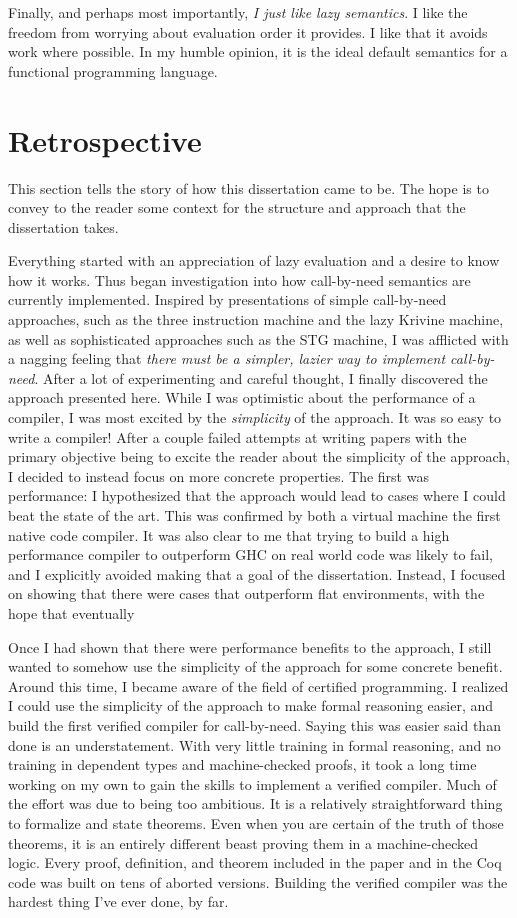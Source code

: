 Finally, and perhaps most importantly, \emph{I just like lazy semantics}. I like
the freedom from worrying about evaluation order it provides. I like that it
avoids work where possible. In my humble opinion, it is the ideal default
semantics for a functional programming language.   

\section{Retrospective}

This section tells the story of how this dissertation came to be. The hope is to
convey to the reader some context for the structure and approach that the
dissertation takes. 

Everything started with an appreciation of lazy evaluation and a desire to know
how it works. Thus began investigation into how call-by-need semantics are
currently implemented. Inspired by presentations of simple call-by-need
approaches, such as the three instruction machine and the lazy Krivine machine,
as well as sophisticated approaches such as the STG machine, I was afflicted
with a nagging feeling that \emph{there must be a simpler, lazier way to
implement call-by-need}. After a lot of experimenting and careful thought, I
finally discovered the approach presented here. While I was optimistic about the
performance of a compiler, I was most excited by the \emph{simplicity} of the
approach. It was so easy to write a compiler! After a couple failed attempts at
writing papers with the primary objective being to excite the reader about
the simplicity of the approach, I decided to instead focus on more concrete
properties. The first was performance: I hypothesized that the approach would
lead to cases where I could beat the state of the art. This was confirmed by
both a virtual machine the first native code compiler. It was also clear to me
that trying to build a high performance compiler to outperform GHC on real world
code was likely to fail, and I explicitly avoided making that a goal of the
dissertation. Instead, I focused on showing that there were cases that
outperform flat environments, with the hope that eventually 

Once I had shown that there were performance benefits to the approach, I still
wanted to somehow use the simplicity of the approach for some concrete benefit.
Around this time, I became aware of the field of certified programming. I
realized I could use the simplicity of the approach to make formal reasoning
easier, and build the first verified compiler for call-by-need. Saying this was
easier said than done is an understatement. With very little training in formal
reasoning, and no training in dependent types and machine-checked proofs, it
took a long time working on my own to gain the skills to implement a verified
compiler. Much of the effort was due to being too ambitious. It is a relatively
straightforward thing to formalize and state theorems. Even when you are certain
of the truth of those theorems, it is an entirely different beast proving them
in a machine-checked logic. Every proof, definition, and theorem included in the
paper and in the Coq code was built on tens of aborted versions. Building the
verified compiler was the hardest thing I've ever done, by far.

